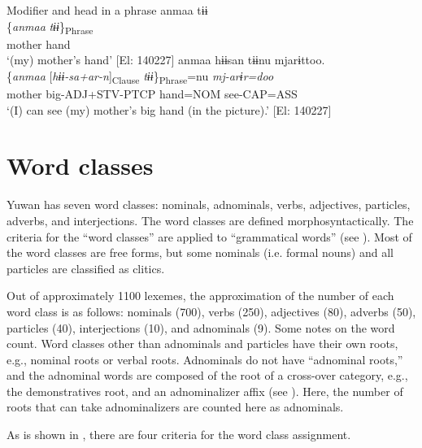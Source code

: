 \ea  Modifier and head in a phrase \label{ex:4.47}
\ea  %
\glll    anmaa  tɨɨ  \\
      \{\textit{anmaa}  \textit{tɨɨ}\}\textsubscript{Phrase}  \\
      mother  hand  \\
    \glt       ‘(my) mother’s hand’ [El: 140227]
\ex\label{ex:4.47b}
\glll   anmaa  hɨɨsan  tɨɨnu  mjarɨttoo.\\
      \{\textit{anmaa}  [\textit{hɨɨ-sa+ar-n}]\textsubscript{Clause} \textit{tɨɨ}\}\textsubscript{Phrase}=nu  \textit{mj-arɨr=doo}\\
      mother  big-ADJ+STV-PTCP  hand=NOM  see-CAP=ASS\\
    \glt       ‘(I) can see (my) mother’s big hand (in the picture).’ [El: 140227]
    \z
\z

\section{Word classes}\label{sec:4.3}

Yuwan has seven word classes: nominals, adnominals, verbs, adjectives, particles, adverbs, and interjections. The word classes are defined morphosyntactically. The criteria for the “word classes” are applied to “grammatical words” (see ). Most of the word classes are free forms, but some nominals (i.e. formal nouns) and all particles are classified as clitics.

Out of approximately 1100 lexemes, the approximation of the number of each word class is as follows: nominals (700), verbs (250), adjectives (80), adverbs (50), particles (40), interjections (10), and adnominals (9). Some notes on the word count. Word classes other than adnominals and particles have their own roots, e.g., nominal roots or verbal roots. Adnominals do not have “adnominal roots,” and the adnominal words are composed of the root of a cross-over category, e.g., the demonstratives root, and an adnominalizer affix (see ). Here, the number of roots that can take adnominalizers are counted here as adnominals.

As is shown in , there are four criteria for the word class assignment.

